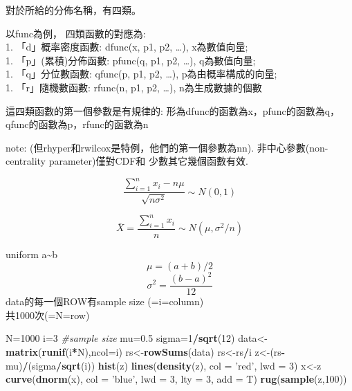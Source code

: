 \documentclass[]{book}
\newenvironment{Shaded}{\begin{snugshade}}{\end{snugshade}}
\newcommand{\KeywordTok}[1]{\textcolor[rgb]{0.13,0.29,0.53}{\textbf{#1}}}
\newcommand{\DataTypeTok}[1]{\textcolor[rgb]{0.13,0.29,0.53}{#1}}
\newcommand{\DecValTok}[1]{\textcolor[rgb]{0.00,0.00,0.81}{#1}}
\newcommand{\FloatTok}[1]{\textcolor[rgb]{0.00,0.00,0.81}{#1}}
\newcommand{\StringTok}[1]{\textcolor[rgb]{0.31,0.60,0.02}{#1}}
\newcommand{\CommentTok}[1]{\textcolor[rgb]{0.56,0.35,0.01}{\textit{#1}}}
\newcommand{\OperatorTok}[1]{\textcolor[rgb]{0.81,0.36,0.00}{\textbf{#1}}}
\newcommand{\NormalTok}[1]{#1}
\theoremstyle{definition}
\theoremstyle{definition}
\theoremstyle{definition}
\theoremstyle{remark}
\begin{document}
對於所給的分佈名稱，有四類。

以func為例， 四類函數的對應為:\\
1. 「d」概率密度函數: dfunc(x, p1, p2, \ldots{}), x為數值向量;\\
1. 「p」(累積)分佈函數: pfunc(q, p1, p2, \ldots{}), q為數值向量;\\
1. 「q」分位數函數: qfunc(p, p1, p2, \ldots{}), p為由概率構成的向量;\\
1. 「r」隨機數函數: rfunc(n, p1, p2, \ldots{}), n為生成數據的個數

這四類函數的第一個參數是有規律的:
形為dfunc的函數為x，pfunc的函數為q，qfunc的函數為p，rfunc的函數為n

note: (但rhyper和rwilcox是特例，他們的第一個參數為nn).
非中心參數(non-centrality parameter)僅對CDF和 少數其它幾個函數有效.

\[ \frac{{\sum\limits_{i = 1}^n {{x_i} - n\mu } }}{{\sqrt {n{\sigma ^2}} }} \sim  N(0,1) \]

\[ \bar X = \frac{{\sum_{i = 1}^n {{x_i} } }}{n} \sim  N(\mu, \sigma^2/n) \]

uniform a\textasciitilde{}b \[\mu = (a+b)/2\]
\[\sigma^2=\frac{(b-a)^2}{12} \] data的每一個ROW有sample size
(=i=column)\\
共1000次(=N=row)

\begin{Shaded}
\begin{Highlighting}[]
\NormalTok{N=}\DecValTok{1000} 
\NormalTok{i=}\DecValTok{3} \CommentTok{#sample size}
\NormalTok{mu=}\FloatTok{0.5}
\NormalTok{sigma=}\DecValTok{1}\OperatorTok{/}\KeywordTok{sqrt}\NormalTok{(}\DecValTok{12}\NormalTok{)}
\NormalTok{data<-}\KeywordTok{matrix}\NormalTok{(}\KeywordTok{runif}\NormalTok{(i}\OperatorTok{*}\NormalTok{N),}\DataTypeTok{ncol=}\NormalTok{i)}
\NormalTok{rs<-}\KeywordTok{rowSums}\NormalTok{(data)}
\NormalTok{rs<-rs}\OperatorTok{/}\NormalTok{i}
\NormalTok{z<-(rs}\OperatorTok{-}\NormalTok{mu)}\OperatorTok{/}\NormalTok{(sigma}\OperatorTok{/}\KeywordTok{sqrt}\NormalTok{(i))}
\KeywordTok{hist}\NormalTok{(z)}
\KeywordTok{lines}\NormalTok{(}\KeywordTok{density}\NormalTok{(z), }\DataTypeTok{col =} \StringTok{'red'}\NormalTok{, }\DataTypeTok{lwd =} \DecValTok{3}\NormalTok{)}
\NormalTok{x<-z}
\KeywordTok{curve}\NormalTok{(}\KeywordTok{dnorm}\NormalTok{(x), }\DataTypeTok{col =} \StringTok{'blue'}\NormalTok{, }\DataTypeTok{lwd =} \DecValTok{3}\NormalTok{, }\DataTypeTok{lty =} \DecValTok{3}\NormalTok{, }\DataTypeTok{add =}\NormalTok{ T)}
\KeywordTok{rug}\NormalTok{(}\KeywordTok{sample}\NormalTok{(z,}\DecValTok{100}\NormalTok{))}
\end{Highlighting}
\end{Shaded}
\end{document}
